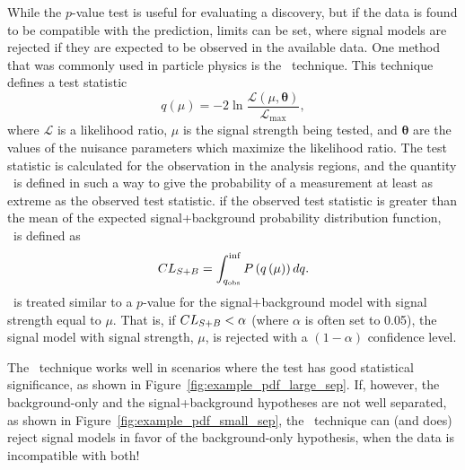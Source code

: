 While the $p$-value test is useful for evaluating a discovery, but if the
data is found to be compatible with the prediction, limits can be set, where
signal models are rejected if they are expected to be observed in the available
data.
One method that was commonly used in particle physics is the \clsb\ technique.
This technique defines a test statistic
\begin{equation}
  q\left( \mu \right) =
  -2 \ln
  \frac{\mathcal{L} \left( \mu, \boldsymbol{\theta} \right)}
  {\mathcal{L}_\mathrm{max}},
\end{equation}
where $\mathcal{L}$ is a likelihood ratio, $\mu$ is the signal strength being
tested, and $\boldsymbol{\theta}$ are the values of the nuisance parameters
which maximize the likelihood ratio.
The test statistic is calculated for the observation in the analysis regions, 
and the quantity \clsb\ is defined in such a way to give the probability
of a measurement at least as extreme as the observed test statistic.
if the observed test statistic is greater than the mean of the expected
signal+background probability distribution function, \clsb\ is defined as
\begin{equation}
  CL_{S+B} = \int_{q_\mathrm{obs}}^{\inf} P\left(q\left(\mu\right)\right) dq.
\end{equation}
\clsb\ is treated similar to a $p$-value for the signal+background model with
signal strength equal to $\mu$.
That is, if $CL_{S+B} < \alpha$ (where $\alpha$ is often set to 0.05), the signal
model with signal strength, $\mu$, is rejected with a $(1-\alpha)$ confidence
level.

The \clsb\ technique works well in scenarios where the test has good
statistical significance, as shown in Figure~\ref{fig:example_pdf_large_sep}.
If, however, the background-only and the signal+background hypotheses are not
well separated, as shown in Figure~\ref{fig:example_pdf_small_sep}, the
\clsb\ technique can (and does) reject signal models in favor of the
background-only hypothesis, when the data is incompatible with both!

